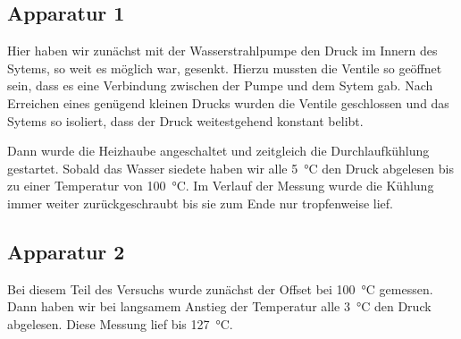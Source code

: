 \subsection{Apparatur 1}

Hier haben wir zunächst mit der Wasserstrahlpumpe den Druck im Innern des Sytems, so weit es möglich war,
gesenkt. Hierzu mussten die Ventile so geöffnet sein, dass es eine Verbindung zwischen der Pumpe
und dem Sytem gab. Nach Erreichen eines genügend kleinen Drucks wurden die Ventile geschlossen und
das Sytems so isoliert, dass der Druck weitestgehend konstant belibt.

Dann wurde die Heizhaube angeschaltet und zeitgleich die Durchlaufkühlung gestartet. Sobald das Wasser
siedete haben wir alle \SI{5}{\celsius} den Druck abgelesen bis zu einer Temperatur von \SI{100}{\celsius}.
Im Verlauf der Messung wurde die Kühlung immer weiter zurückgeschraubt bis sie zum Ende nur tropfenweise
lief.

\subsection{Apparatur 2}

Bei diesem Teil des Versuchs wurde zunächst der Offset bei \SI{100}{\celsius} gemessen. Dann haben wir bei
langsamem Anstieg der Temperatur alle \SI{3}{\celsius} den Druck abgelesen. Diese Messung lief bis \SI{127}{\celsius}.

\newpage
